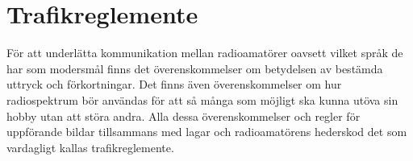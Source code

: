 \chapter{Trafikreglemente}
\label{ch:trafikreglemente}

För att underlätta kommunikation mellan radioamatörer oavsett vilket språk de
har som modersmål finns det överenskommelser om betydelsen av bestämda uttryck
och förkortningar.
Det finns även överenskommelser om hur radiospektrum bör användas för att så
många som möjligt ska kunna utöva sin hobby utan att störa andra.
Alla dessa överenskommelser och regler för uppförande bildar tillsammans med
lagar och radioamatörens hederskod det som vardagligt kallas trafikreglemente.